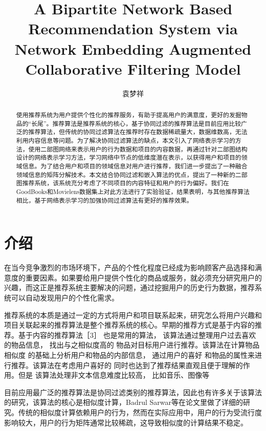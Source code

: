 \documentclass[lang=cn,11pt]{elegantpaper}
\title{A Bipartite Network Based Recommendation System via Network Embedding Augmented Collaborative Filtering Model }
\author{袁梦祥}
\institute{安徽大学大数据与云服务工程实验室}
\date{}
\begin{document}
\maketitle

\begin{abstract}
\noindent 使用推荐系统为用户提供个性化的推荐服务，有助于提高用户的满意度，更好的发掘物品的“长尾”。推荐算法是推荐系统的核心，基于协同过滤的推荐算法是目前应用比较广泛的推荐算法，但传统的协同过滤算法在推荐时存在数据稀疏量大，数据维数高，无法利用内容信息等问题。为了解决协同过滤算法的缺点，本文引入了网络表示学习的方法，使用二部图网络来表示用户的行为数据和项目的内容数据，再通过针对二部图结构设计的网络表示学习方法，学习网络中节点的低维度潜在表示，以获得用户和项目的领域信息。为了结合用户和项目的领域信息对用户进行推荐，我们进一步提出了一种融合领域信息的矩阵分解技术。本文结合协同过滤和嵌入算法的优点，提出了一种新的二部图推荐系统，该系统充分考虑了不同项目的内容特征和用户的行为偏好。我们在GoodBooks和Movielens数据集上对此方法进行了实验验证，结果表明，与其他推荐算法相比，基于网络表示学习的加强协同过滤算法有更好的推荐效果。
\end{abstract}


\section{介绍}

在当今竞争激烈的市场环境下，产品的个性化程度已经成为影响顾客产品选择和满意度的重要因素。如果要给用户提供个性化的商品或服务，就必须充分研究用户的兴趣，而这正是推荐系统主要解决的问题，通过挖掘用户的历史行为数据，推荐系统可以自动发现用户的个性化需求。

推荐系统的本质是通过一定的方式将用户和项目联系起来，研究怎么将用户兴趣和项目关联起来的推荐算法是整个推荐系统的核心。早期的推荐方式是基于内容的推荐。基于内容的推荐算法［3］ 也是常用的算法， 该算法通过整理用户过去喜欢的物品信息， 找出与之相似度高的
物品对目标用户进行推荐。该算法在计算物品相似度
的基础上分析用户和物品的内部信息， 通过用户的喜好
和物品的属性来进行推荐。该算法在考虑用户喜好的
同时也达到了推荐结果直观且便于理解的作用。但是
该算法处理非文本信息难度比较高， 比如音乐、图像等

目前应用最广泛的推荐算法是协同过滤类别的推荐算法，因此也有许多关于该算法的研究\cite{Linden2003}，该算法的核心是相似度计算，Badrul Sarwar等在论文里做了详细的研究\cite{Sarwar2001}。传统的相似度计算依赖用户的行为，然而在实际应用中，用户的行为受流行度影响较大，用户的行为矩阵通常比较稀疏，这导致相似度的计算结果不稳定。
\end{document}
